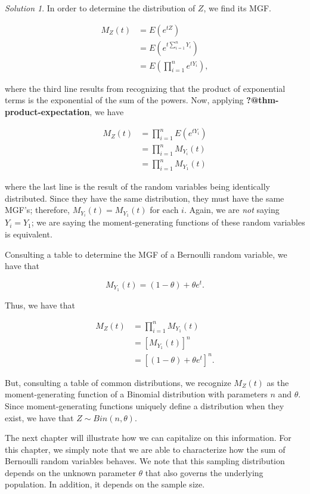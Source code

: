 \documentclass[
  letterpaper,
  DIV=11,
  numbers=noendperiod]{scrreprt}
\theoremstyle{definition}
\theoremstyle{plain}
\theoremstyle{definition}
\theoremstyle{remark}
\newtheorem*{solution}{Solution}
\begin{document}
\begin{solution}
In order to determine the distribution of \(Z\), we find its MGF.

\[
\begin{aligned}
  M_Z(t)
    &= E\left(e^{tZ}\right) \\
    &= E\left(e^{t\sum_{i=1}^{n} Y_i}\right) \\
    &= E\left(\prod_{i=1}^{n} e^{tY_i}\right),
\end{aligned}
\]

where the third line results from recognizing that the product of
exponential terms is the exponential of the sum of the powers. Now,
applying \textbf{?@thm-product-expectation}, we have

\[
\begin{aligned}
  M_Z(t)
    &= \prod_{i=1}^{n} E\left(e^{tY_i}\right) \\
    &= \prod_{i=1}^{n} M_{Y_i}(t) \\
    &= \prod_{i=1}^{n} M_{Y_1}(t)
\end{aligned}
\]

where the last line is the result of the random variables being
identically distributed. Since they have the same distribution, they
must have the same MGF's; therefore, \(M_{Y_i}(t) = M_{Y_1}(t)\) for
each \(i\). Again, we are \emph{not} saying \(Y_i = Y_1\); we are saying
the moment-generating functions of these random variables is equivalent.

Consulting a table to determine the MGF of a Bernoulli random variable,
we have that

\[M_{Y_1}(t) = (1 - \theta) + \theta e^t.\]

Thus, we have that

\[
\begin{aligned}
  M_Z(t)
    &= \prod_{i=1}^{n} M_{Y_1}(t) \\
    &= \left[M_{Y_1}(t)\right]^n \\
    &= \left[(1 - \theta) + \theta e^{t}\right]^n.
\end{aligned}
\]

But, consulting a table of common distributions, we recognize \(M_Z(t)\)
as the moment-generating function of a Binomial distribution with
parameters \(n\) and \(\theta\). Since moment-generating functions
uniquely define a distribution when they exist, we have that
\(Z \sim Bin(n, \theta)\).
\end{solution}

The next chapter will illustrate how we can capitalize on this
information. For this chapter, we simply note that we are able to
characterize how the sum of Bernoulli random variables behaves. We note
that this sampling distribution depends on the unknown parameter
\(\theta\) that also governs the underlying population. In addition, it
depends on the sample size.
\end{document}
